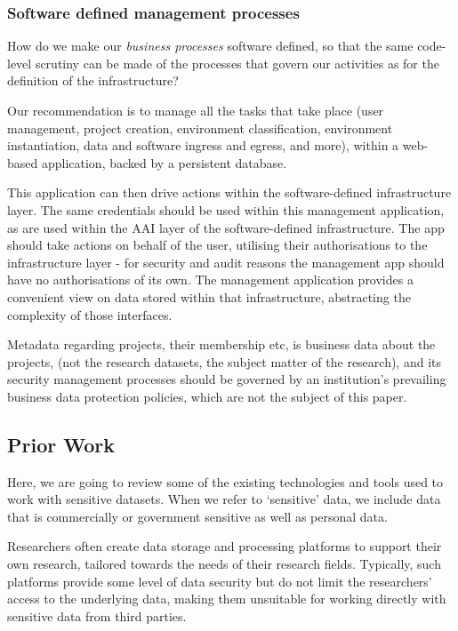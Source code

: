 \documentclass[10pt,a4paper,twocolumn]{article}
\begin{document}
\subsubsection{Software defined management processes}

How do we make our \emph{business processes} software defined, so that the same code-level scrutiny
can be made of the processes that govern our activities as for the definition of the 
infrastructure?

Our recommendation is to
manage all the tasks that take place (user management, project creation, environment classification,
environment instantiation, data and software ingress and egress, and more), within a web-based application,
backed by a persistent database. 


This application can then drive actions within the software-defined infrastructure layer.
The same credentials should be used within this management application, as are used within the AAI
layer of the software-defined infrastructure. The app should take actions on behalf of the user, utilising their authorisations to the infrastructure layer -
for security and audit reasons the management app should have no authorisations of its own.
The management application provides a convenient view on data stored within that infrastructure, abstracting the complexity of those interfaces. 

Metadata regarding projects, their membership etc, is business data about the projects, (not the research datasets, the subject matter of the research), and its security management processes should be governed by an institution's prevailing business data protection policies, which are not the subject of this paper.

\subsection{Prior Work}
Here, we are going to review some of the existing technologies and tools used to work with sensitive datasets. When we refer to ‘sensitive’ data, we include data that is commercially or government sensitive as well as personal data.


Researchers often create data storage and processing platforms to support their own research, tailored towards the needs of their research fields. Typically, such platforms provide some level of data security but do not limit the researchers’ access to the underlying data, making them unsuitable for working directly with sensitive data from third parties. 
\end{document}

